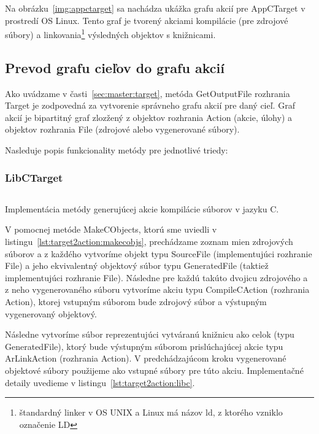 Na obrázku~\ref{img:appctarget} sa nachádza ukážka grafu akcií pre AppCTarget
v prostredí OS Linux. Tento graf je tvorený akciami kompilácie (pre zdrojové
súbory) a linkovania\footnote{štandardný linker v OS UNIX a Linux má názov ld,
z ktorého vzniklo označenie LD} výsledných objektov s knižnicami.

\subsection{Prevod grafu cie\v{l}ov do grafu akci\'{i}}
\label{sec:master:target2action}

Ako uvádzame v časti~\ref{sec:master:target}, metóda GetOutputFile rozhrania Target
je zodpovedná za vytvorenie správneho grafu akcií pre daný cieľ. Graf akcií je
bipartitný graf zlozžený z objektov rozhrania Action (akcie, úlohy) a objektov
rozhrania File (zdrojové alebo vygenerované súbory).

Nasleduje popis funkcionality metódy pre jednotlivé triedy:

\subsubsection{LibCTarget}

\begin{listing}[h]
  \inputminted[frame=lines,framesep=2mm,linenos,fontsize=\scriptsize,firstline=23,lastline=59]{go}{/home/pepol/src/imterra/forge/client/actions/util.go}
  \caption[Pomocná metóda MakeCObjects]{Implementácia metódy generujúcej akcie
  kompilácie súborov v jazyku C.}
  \label{lst:target2action:makecobjs}
\end{listing}

V pomocnej metóde MakeCObjects, ktorú sme uviedli v listingu~\ref{lst:target2action:makecobjs},
prechádzame zoznam mien zdrojových súborov a z každého vytvoríme objekt typu
SourceFile (implementujúci rozhranie File) a jeho ekvivalentný objektový súbor
typu GeneratedFile (taktiež implementujúci rozhranie File). Následne pre každú
takúto dvojicu zdrojového a z neho vygenerovaného súboru vytvoríme akciu typu
CompileCAction (rozhrania Action), ktorej vstupným súborom bude zdrojový
súbor a výstupným vygenerovaný objektový.

Následne vytvoríme súbor reprezentujúci vytváranú knižnicu ako celok (typu GeneratedFile),
ktorý bude výstupným súborom prislúchajúcej akcie typu ArLinkAction (rozhrania Action).
V predchádzajúcom kroku vygenerované objektové súbory použijeme ako vstupné
súbory pre túto akciu. Implementačné detaily uvedieme v listingu~\ref{lst:target2action:libc}.

